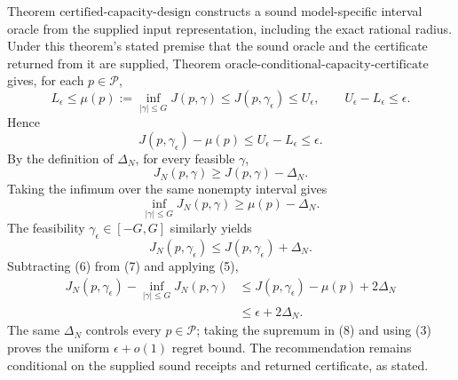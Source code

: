Theorem \(\mathrm{certified\mbox{-}capacity\mbox{-}design}\) constructs a sound model-specific interval oracle from the supplied input representation, including the exact rational radius.  Under this theorem's stated premise that the sound oracle and the certificate returned from it are supplied, Theorem \(\mathrm{oracle\mbox{-}conditional\mbox{-}capacity\mbox{-}certificate}\) gives, for each \(p\in\mathcal P\),
\[
 L_\epsilon\leq\mu(p):=\inf_{|\gamma|\leq G}J(p,\gamma)
 \leq J(p,\gamma_\epsilon)\leq U_\epsilon,
 \qquad U_\epsilon-L_\epsilon\leq\epsilon.
\tag{4}
\]
Hence
\[
 J(p,\gamma_\epsilon)-\mu(p)
 \leq U_\epsilon-L_\epsilon\leq\epsilon.
\tag{5}
\]
By the definition of \(\Delta_N\), for every feasible \(\gamma\),
\[
 J_N(p,\gamma)\geq J(p,\gamma)-\Delta_N.
\]
Taking the infimum over the same nonempty interval gives
\[
 \inf_{|\gamma|\leq G}J_N(p,\gamma)
 \geq\mu(p)-\Delta_N.
\tag{6}
\]
The feasibility \(\gamma_\epsilon\in[-G,G]\) similarly yields
\[
 J_N(p,\gamma_\epsilon)
 \leq J(p,\gamma_\epsilon)+\Delta_N.
\tag{7}
\]
Subtracting (6) from (7) and applying (5),
\[
 \begin{aligned}
 J_N(p,\gamma_\epsilon)-\inf_{|\gamma|\leq G}J_N(p,\gamma)
 &\leq J(p,\gamma_\epsilon)-\mu(p)+2\Delta_N\\
 &\leq\epsilon+2\Delta_N.
 \end{aligned}
\tag{8}
\]
The same \(\Delta_N\) controls every \(p\in\mathcal P\); taking the supremum in (8) and using (3) proves the uniform \(\epsilon+o(1)\) regret bound.  The recommendation remains conditional on the supplied sound receipts and returned certificate, as stated.

